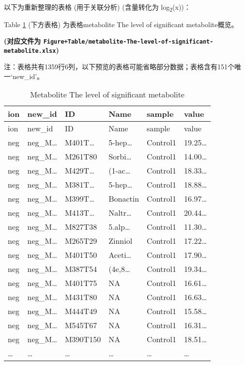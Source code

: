 \documentclass[
]{article}
\begin{document}
以下为重新整理的表格 (用于关联分析) (含量转化为 log\textsubscript{2}(x))：

Table \ref{tab:metabolite-The-level-of-significant-metabolite} (下方表格) 为表格metabolite The level of significant metabolite概览。

\textbf{(对应文件为 \texttt{Figure+Table/metabolite-The-level-of-significant-metabolite.xlsx})}

\begin{center}\begin{tcolorbox}[colback=gray!10, colframe=gray!50, width=0.9\linewidth, arc=1mm, boxrule=0.5pt]注：表格共有1359行6列，以下预览的表格可能省略部分数据；表格含有151个唯一`new\_id'。
\end{tcolorbox}
\end{center}

\begin{longtable}[]{@{}llllll@{}}
\caption{\label{tab:metabolite-The-level-of-significant-metabolite}Metabolite The level of significant metabolite}\tabularnewline
\toprule
ion & new\_id & ID & Name & sample & value\tabularnewline
\midrule
\endfirsthead
\toprule
ion & new\_id & ID & Name & sample & value\tabularnewline
\midrule
\endhead
neg & neg\_M\ldots{} & M401T\ldots{} & 5-hep\ldots{} & Control1 & 19.25\ldots{}\tabularnewline
neg & neg\_M\ldots{} & M261T80 & Sorbi\ldots{} & Control1 & 14.00\ldots{}\tabularnewline
neg & neg\_M\ldots{} & M429T\ldots{} & (1-ac\ldots{} & Control1 & 18.33\ldots{}\tabularnewline
neg & neg\_M\ldots{} & M381T\ldots{} & 5-hep\ldots{} & Control1 & 18.88\ldots{}\tabularnewline
neg & neg\_M\ldots{} & M399T\ldots{} & Bonactin & Control1 & 16.97\ldots{}\tabularnewline
neg & neg\_M\ldots{} & M413T\ldots{} & Naltr\ldots{} & Control1 & 20.44\ldots{}\tabularnewline
neg & neg\_M\ldots{} & M827T38 & 5.alp\ldots{} & Control1 & 11.30\ldots{}\tabularnewline
neg & neg\_M\ldots{} & M265T29 & Zinniol & Control1 & 17.22\ldots{}\tabularnewline
neg & neg\_M\ldots{} & M401T50 & Aceti\ldots{} & Control1 & 17.90\ldots{}\tabularnewline
neg & neg\_M\ldots{} & M387T54 & (4e,8\ldots{} & Control1 & 19.34\ldots{}\tabularnewline
neg & neg\_M\ldots{} & M401T75 & NA & Control1 & 16.61\ldots{}\tabularnewline
neg & neg\_M\ldots{} & M431T80 & NA & Control1 & 16.63\ldots{}\tabularnewline
neg & neg\_M\ldots{} & M444T49 & NA & Control1 & 15.58\ldots{}\tabularnewline
neg & neg\_M\ldots{} & M545T67 & NA & Control1 & 16.31\ldots{}\tabularnewline
neg & neg\_M\ldots{} & M390T150 & NA & Control1 & 18.51\ldots{}\tabularnewline
\ldots{} & \ldots{} & \ldots{} & \ldots{} & \ldots{} & \ldots{}\tabularnewline
\bottomrule
\end{longtable}
\end{document}
